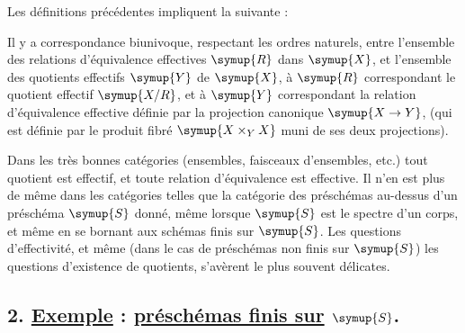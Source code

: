 Les définitions précédentes impliquent la 
suivante :

 Il y a correspondance biunivoque, respectant les
ordres naturels, entre l'ensemble des relations d'équivalence effectives $\symup{R}$
dans $\symup{X}$, et l'ensemble des quotients effectifs $\symup{Y}$ de $\symup{X}$, à $\symup{R}$
correspondant le quotient effectif $\symup{X/R}$, et à $\symup{Y}$ correspondant la relation
d'équivalence effective définie par la projection canonique
$\symup{X\to Y}$, (qui est définie par le produit fibré $\symup{X\times_Y X}$
muni de ses deux projections).

Dans les très bonnes catégories (ensembles, faisceaux d'ensembles, etc.) tout
quotient est effectif, et toute relation d'équivalence est effective. Il n'en
est plus de même dans les catégories telles que la catégorie des préschémas
au-dessus d'un préschéma $\symup{S}$ donné, même lorsque $\symup{S}$ est le spectre d'un corps,
et même en se bornant aux schémas finis sur $\symup{S}$. Les questions d'effectivité,
et même (dans le cas de préschémas non finis sur $\symup{S}$) les questions d'existence
de quotients, s'avèrent le plus souvent délicates.

\subsection*{\textnormal{2. \uline{Exemple} : \uline{préschémas finis sur} $\symup{S}$.}}

